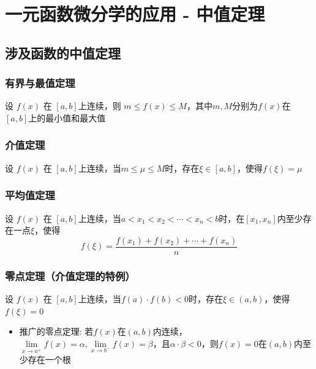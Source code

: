 \documentclass[a4paper,12pt]{article}
\begin{document}



    \section{一元函数微分学的应用 - 中值定理}

    \subsection{涉及函数的中值定理}

    \subsubsection{有界与最值定理}

    设 $f(x)$ 在 $[a, b]$上连续，则 $m \leq f(x) \leq M$，其中$m, M$分别为$f(x)$在$[a, b]$上的最小值和最大值

    \subsubsection{介值定理}

    设 $f(x)$ 在 $[a, b]$上连续，当$m \leq \mu \leq M$时，存在$\xi \in [a, b]$，使得$f(\xi) = \mu$

    \subsubsection{平均值定理}

    设 $f(x)$ 在 $[a, b]$上连续，当$a < x_1 < x_2 < \cdots < x_n < b$时，在$[x_1, x_n]$内至少存在一点$\xi$，使得
    \[
        f(\xi) = \frac{f(x_1) + f(x_2) + \cdots + f(x_n)}{n}
    \]

    \subsubsection{零点定理（介值定理的特例）}

    设 $f(x)$ 在 $[a, b]$上连续，当$f(a)\cdot f(b) < 0$时，存在$\xi \in (a, b)$，使得$f(\xi) = 0$
    \begin{itemize}
        \item 推广的零点定理: 若$f(x)$在$(a, b)$内连续，$\lim\limits_{x \to a^+} f(x) = \alpha, \lim\limits_{x \to b^-} f(x) = \beta$，且$\alpha \cdot \beta < 0$，则$f(x) = 0$在$(a, b)$内至少存在一个根
    \end{itemize}
\end{document}
